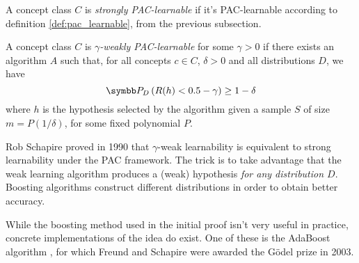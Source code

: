 \begin{definition}
A concept class \(C\) is \emph{strongly PAC-learnable} if it's PAC-learnable according to definition \ref{def:pac_learnable}, from the previous subsection.
\end{definition}

\begin{definition}
A concept class \(C\) is \emph{\(\gamma\)-weakly PAC-learnable} for some \(\gamma > 0\) if there exists an algorithm \(A\) such that, for all concepts \(c \in C\), \(\delta > 0\) and all distributions \(D\), we have
\[
    \probability_D \left(R(h) < 0.5 - \gamma\right) \geq 1 - \delta
\]
where \(h\) is the hypothesis selected by the algorithm given a sample \(S\) of size \(m = P(1/\delta)\), for some fixed polynomial \(P\).
\end{definition}

Rob Schapire proved \cite{Schapire1990} in 1990 that \(\gamma\)-weak learnability is equivalent to strong learnability under the PAC framework. The trick is to take advantage that the weak learning algorithm produces a (weak) hypothesis \emph{for any distribution \(D\)}. Boosting algorithms construct different distributions in order to obtain better accuracy.

While the boosting method used in the initial proof isn't very useful in practice, concrete implementations of the idea do exist. One of these is the AdaBoost algorithm \cite{Freund1995}, for which Freund and Schapire were awarded the Gödel prize in 2003.

